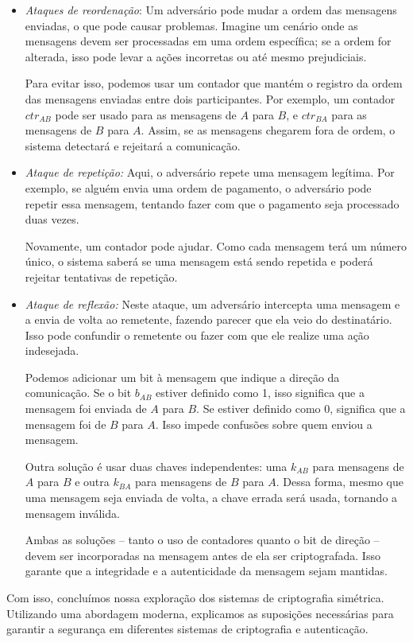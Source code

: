 \begin{itemize}
\item[] {\em Ataques de reordenação}:
  Um adversário pode mudar a ordem das mensagens enviadas, o que pode causar problemas.
  Imagine um cenário onde as mensagens devem ser processadas em uma ordem específica;
  se a ordem for alterada, isso pode levar a ações incorretas ou até mesmo prejudiciais.

  Para evitar isso, podemos usar um contador que mantém o registro da ordem das mensagens enviadas entre dois participantes.
  Por exemplo, um contador $ctr_{AB}$ pode ser usado para as mensagens de $A$ para $B$, e $ctr_{BA}$ para as mensagens de $B$ para $A$.
  Assim, se as mensagens chegarem fora de ordem, o sistema detectará e rejeitará a comunicação.
\item[] {\em Ataque de repetição:}
  Aqui, o adversário repete uma mensagem legítima.
  Por exemplo, se alguém envia uma ordem de pagamento, o adversário pode repetir essa mensagem, tentando fazer com que o pagamento seja processado duas vezes.

  Novamente, um contador pode ajudar.
  Como cada mensagem terá um número único, o sistema saberá se uma mensagem está sendo repetida e poderá rejeitar tentativas de repetição.
\item[] {\em Ataque de reflexão:}
  Neste ataque, um adversário intercepta uma mensagem e a envia de volta ao remetente, fazendo parecer que ela veio do destinatário.
  Isso pode confundir o remetente ou fazer com que ele realize uma ação indesejada.

  Podemos adicionar um bit à mensagem que indique a direção da comunicação.
  Se o bit $b_{AB}$ estiver definido como 1, isso significa que a mensagem foi enviada de $A$ para $B$.
  Se estiver definido como 0, significa que a mensagem foi de $B$ para $A$.
  Isso impede confusões sobre quem enviou a mensagem.

  Outra solução é usar duas chaves independentes:
  uma $k_{AB}$ para mensagens de $A$ para $B$ e outra $k_{BA}$ para mensagens de $B$ para $A$.
  Dessa forma, mesmo que uma mensagem seja enviada de volta, a chave errada será usada, tornando a mensagem inválida.

Ambas as soluções -- tanto o uso de contadores quanto o bit de direção -- devem ser incorporadas na mensagem antes de ela ser criptografada.
Isso garante que a integridade e a autenticidade da mensagem sejam mantidas.
\end{itemize}

Com isso, concluímos nossa exploração dos sistemas de criptografia simétrica.
Utilizando uma abordagem moderna, explicamos as suposições necessárias para garantir a segurança em diferentes sistemas de criptografia e autenticação.

